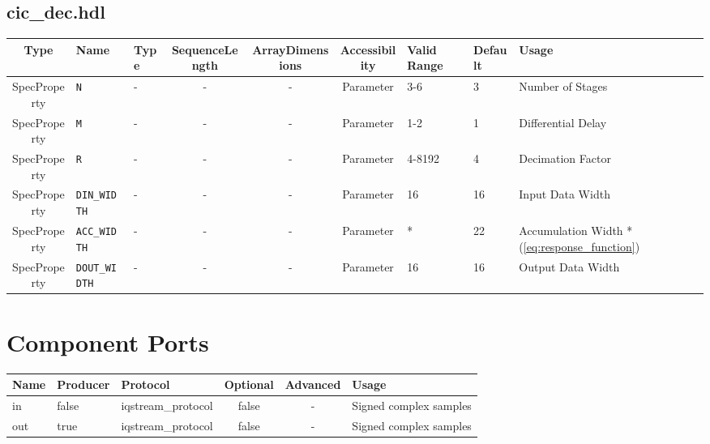 \documentclass{article}
\def\comp{cic\_dec}
\begin{document}
\begin{landscape}
	\subsection*{\comp.hdl}
	\begin{scriptsize}
		\begin{tabular}{|c|p{2cm}|p{1cm}|c|c|c|p{2cm}|p{1cm}|p{5cm}|}
			\hline
			\rowcolor{blue}
			Type         & Name              & Type & SequenceLength & ArrayDimensions & Accessibility & Valid Range & Default & Usage                                            \\
			\hline
			SpecProperty & \verb+N+          & -    & -              & -               & Parameter     & 3-6         & 3       & Number of Stages                                 \\
			\hline
			SpecProperty & \verb+M+          & -    & -              & -               & Parameter     & 1-2         & 1       & Differential Delay                               \\
			\hline
			SpecProperty & \verb+R+          & -    & -              & -               & Parameter     & 4-8192      & 4       & Decimation Factor                                \\
			\hline
			SpecProperty & \verb+DIN_WIDTH+  & -    & -              & -               & Parameter     & 16          & 16      & Input Data Width                                 \\
			\hline
			SpecProperty & \verb+ACC_WIDTH+  & -    & -              & -               & Parameter     & *           & 22      & Accumulation Width *(\ref{eq:response_function}) \\
			\hline
			SpecProperty & \verb+DOUT_WIDTH+ & -    & -              & -               & Parameter     & 16          & 16      & Output Data Width                                \\
			\hline
		\end{tabular}
	\end{scriptsize}

	\section*{Component Ports}
	\begin{scriptsize}
		\begin{tabular}{|M{2cm}|M{1.5cm}|M{4cm}|c|c|M{9cm}|}
			\hline
			\rowcolor{blue}
			Name & Producer & Protocol           & Optional & Advanced & Usage                  \\
			\hline
			in   & false    & iqstream\_protocol & false    & -        & Signed complex samples \\
			\hline
			out  & true     & iqstream\_protocol & false    & -        & Signed complex samples \\
			\hline
		\end{tabular}
	\end{scriptsize}

\end{landscape}
\end{document}
